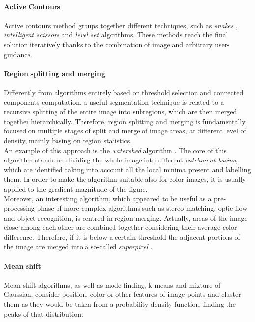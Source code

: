 \paragraph*{Active Contours}

Active contours \cite{balke1998active} method groups together different techniques, such as \textit{snakes} \cite{kass1988snakes}, \textit{intelligent scissors} \cite{mortensen1995intelligent} and \textit{level set} algorithms.
These methods reach the final solution iteratively thanks to the combination of image and arbitrary user-guidance.

\paragraph*{Region splitting and merging}

Differently from algorithms entirely based on threshold selection and connected components computation, a useful segmentation technique is related to a recursive splitting of the entire image into subregions, which are then merged together hierarchically. 
Therefore, region splitting and merging is fundamentally focused on multiple stages of split and merge of image areas, at different level of density, mainly basing on region statistics. \\
An example of this approach is the \textit{watershed} algorithm \cite{vincent1991watersheds}.
The core of this algorithm stands on dividing the whole image into different \textit{catchment basins}, which are identified taking into account all the local minima present and labelling them. 
In order to make the algorithm suitable also for color images, it is usually applied to the gradient magnitude of the figure. \\
Moreover, an interesting algorithm, which appeared to be useful as a pre-processing phase of more complex algorithms such as stereo matching, optic flow and object recognition, is centred in region merging.
Actually, areas of the image close among each other are combined together considering their average color difference. 
Therefore, if it is below a certain threshold the adjacent portions of the image are merged into a so-called \textit{superpixel} \cite{mori2004recovering}.

\paragraph*{Mean shift}

Mean-shift algorithms, as well as mode finding, k-means and mixture of Gaussian, consider position, color or other features of image points and cluster them as they would be taken from a probability density function, finding the peaks of that distribution.

